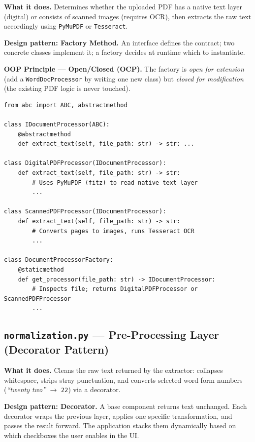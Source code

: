 \documentclass[12pt, a4paper]{article}
\begin{document}
\textbf{What it does.} Determines whether the uploaded PDF has a native text
layer (digital) or consists of scanned images (requires OCR), then extracts
the raw text accordingly using \texttt{PyMuPDF} or \texttt{Tesseract}.
 
\textbf{Design pattern: Factory Method.} An interface defines the contract;
two concrete classes implement it; a factory decides at runtime which to
instantiate.
 
\begin{mdframed}[style=patternbox]
\textbf{OOP Principle --- Open/Closed (OCP).} The factory is \emph{open for
extension} (add a \texttt{WordDocProcessor} by writing one new class) but
\emph{closed for modification} (the existing PDF logic is never touched).
\end{mdframed}
 
\begin{lstlisting}[caption={extractor.py --- interface and factory skeleton}]
from abc import ABC, abstractmethod
 
class IDocumentProcessor(ABC):
    @abstractmethod
    def extract_text(self, file_path: str) -> str: ...
 
class DigitalPDFProcessor(IDocumentProcessor):
    def extract_text(self, file_path: str) -> str:
        # Uses PyMuPDF (fitz) to read native text layer
        ...
 
class ScannedPDFProcessor(IDocumentProcessor):
    def extract_text(self, file_path: str) -> str:
        # Converts pages to images, runs Tesseract OCR
        ...
 
class DocumentProcessorFactory:
    @staticmethod
    def get_processor(file_path: str) -> IDocumentProcessor:
        # Inspects file; returns DigitalPDFProcessor or ScannedPDFProcessor
        ...
\end{lstlisting}
 
\subsection{\texttt{normalization.py} --- Pre-Processing Layer (Decorator Pattern)}
 
\textbf{What it does.} Cleans the raw text returned by the extractor:
collapses whitespace, strips stray punctuation, and converts selected
word-form numbers (\emph{``twenty two''} $\to$ \texttt{22}) via a decorator.
 
\textbf{Design pattern: Decorator.} A base component returns text unchanged.
Each decorator wraps the previous layer, applies one specific transformation,
and passes the result forward. The application stacks them dynamically based
on which checkboxes the user enables in the UI.
 
\end{document}
